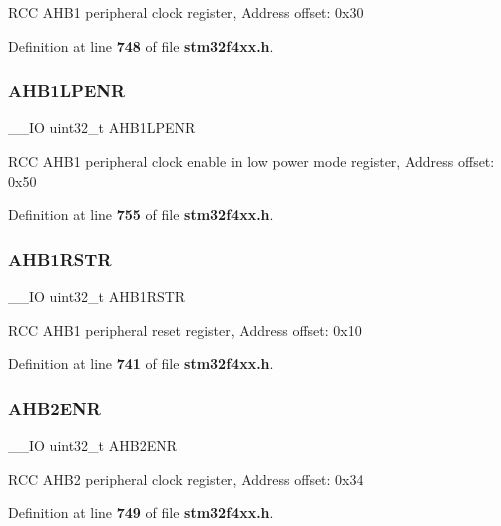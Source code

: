 R\+CC A\+H\+B1 peripheral clock register, Address offset\+: 0x30 

Definition at line \textbf{ 748} of file \textbf{ stm32f4xx.\+h}.

\mbox{\label{structRCC__TypeDef_aae70b1922167eb58d564cb82d39fd10b}} 
\subsubsection{A\+H\+B1\+L\+P\+E\+NR}
{\footnotesize\ttfamily \+\_\+\+\_\+\+IO uint32\+\_\+t A\+H\+B1\+L\+P\+E\+NR}

R\+CC A\+H\+B1 peripheral clock enable in low power mode register, Address offset\+: 0x50 

Definition at line \textbf{ 755} of file \textbf{ stm32f4xx.\+h}.

\mbox{\label{structRCC__TypeDef_a46c20c598e9e12f919f0ea47ebcbc90f}} 
\subsubsection{A\+H\+B1\+R\+S\+TR}
{\footnotesize\ttfamily \+\_\+\+\_\+\+IO uint32\+\_\+t A\+H\+B1\+R\+S\+TR}

R\+CC A\+H\+B1 peripheral reset register, Address offset\+: 0x10 

Definition at line \textbf{ 741} of file \textbf{ stm32f4xx.\+h}.

\mbox{\label{structRCC__TypeDef_a5e92ed32c33c92e7ebf6919400ad535b}} 
\subsubsection{A\+H\+B2\+E\+NR}
{\footnotesize\ttfamily \+\_\+\+\_\+\+IO uint32\+\_\+t A\+H\+B2\+E\+NR}

R\+CC A\+H\+B2 peripheral clock register, Address offset\+: 0x34 

Definition at line \textbf{ 749} of file \textbf{ stm32f4xx.\+h}.

